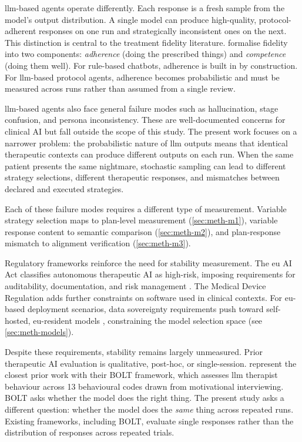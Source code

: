 \gls{llm}-based agents operate differently. Each response is a fresh sample
from the model's output distribution. A single model can produce
high-quality, protocol-adherent responses on one run and strategically
inconsistent ones on the next. This distinction is central to the treatment
fidelity literature. \textcite{TYX7W5ZM} formalise fidelity into two
components: \emph{adherence} (doing the prescribed things) and
\emph{competence} (doing them well). For rule-based chatbots, adherence is
built in by construction. For \gls{llm}-based protocol agents, adherence
becomes probabilistic and must be measured across runs rather than assumed
from a single review.

\gls{llm}-based agents also face general failure modes such as hallucination,
stage confusion, and persona inconsistency. These are well-documented
concerns for clinical AI but fall outside the scope of this study. The
present work focuses on a narrower problem: the probabilistic nature of
\gls{llm} outputs means that identical therapeutic contexts can produce
different outputs on each run. When the same patient presents the same
nightmare, stochastic sampling can lead to different strategy selections,
different therapeutic responses, and mismatches between declared and
executed strategies.

Each of these failure modes requires a different type of measurement. Variable
strategy selection maps to plan-level measurement (\autoref{sec:meth-m1}),
variable response content to semantic comparison (\autoref{sec:meth-m2}),
and plan-response mismatch to alignment verification
(\autoref{sec:meth-m3}).

Regulatory frameworks reinforce the need for stability measurement. The
\gls{eu} AI Act classifies autonomous therapeutic AI as high-risk, imposing
requirements for auditability, documentation, and risk management
\parencite{X5TYM56Q, A823HQRV}. The Medical Device Regulation adds further
constraints on software used in clinical contexts. For \gls{eu}-based
deployment scenarios, data sovereignty requirements push toward self-hosted,
\gls{eu}-resident models \parencite{2QMKF3RM}, constraining the model
selection space (see \autoref{sec:meth-models}).

Despite these requirements, stability remains largely unmeasured. Prior
therapeutic AI evaluation is qualitative, post-hoc, or single-session.
\textcite{B97RI7GA} represent the closest prior work with their BOLT
framework, which assesses \gls{llm} therapist behaviour across 13
behavioural codes drawn from motivational interviewing. BOLT asks whether
the model does the right thing. The present study asks a different question:
whether the model does the \emph{same} thing across repeated runs. Existing
frameworks, including BOLT, evaluate single responses rather than the
distribution of responses across repeated trials.

